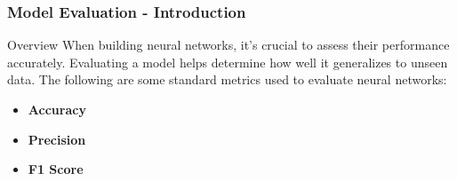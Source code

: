 \documentclass[aspectratio=169]{beamer}
\begin{document}
\begin{frame}[fragile]
    \frametitle{Model Evaluation - Introduction}
    \begin{block}{Overview}
        When building neural networks, it's crucial to assess their performance accurately. Evaluating a model helps determine how well it generalizes to unseen data. The following are some standard metrics used to evaluate neural networks:
    \end{block}
    \begin{itemize}
        \item \textbf{Accuracy}
        \item \textbf{Precision}
        \item \textbf{F1 Score}
    \end{itemize}
\end{frame}
\end{document}
